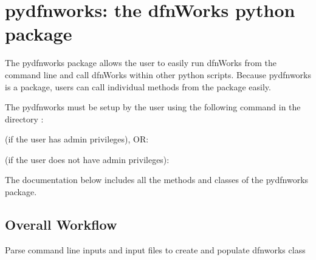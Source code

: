 \documentclass[letterpaper,10pt,english]{sphinxmanual}
\begin{document}
\begin{sphinxVerbatim}[commandchars=\\\{\}]
 

 

 

 

\end{sphinxVerbatim}


\chapter{pydfnworks: the dfnWorks python package}
\label{\detokenize{pydfnworks:dfnworks-python-chapter}}\label{\detokenize{pydfnworks::doc}}\label{\detokenize{pydfnworks:pydfnworks-the-dfnworks-python-package}}
The pydfnworks package allows the user to easily run dfnWorks from the command line and  call dfnWorks within other python scripts. Because pydfnworks is a package, users can call individual methods from the package easily.

The pydfnworks must be setup by the user using the following command in the directory  :

 (if the user has admin privileges), OR:

 (if the user does not have admin privileges):

The documentation below includes all the methods and classes of the pydfnworks package.


\section{Overall Workflow}
\label{\detokenize{pydfnworks:overall-workflow}}

\begin{fulllineitems}
\label{\detokenize{pydfnworks:pydfnworks.create_dfn}}
Parse command line inputs and input files to create and populate dfnworks class

\end{fulllineitems}
\end{document}
